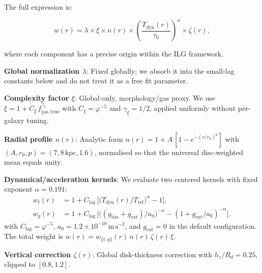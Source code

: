 \documentclass[12pt,a4paper]{article}
\begin{document}
The full expression is:

\begin{equation}
w(r) = \lambda \times \xi \times n(r) \times \left(\frac{T_\mathrm{dyn}(r)}{\tau_0}\right)^\alpha \times \zeta(r),
\end{equation}

where each component has a precise origin within the ILG framework.

\textbf{Global normalization $\lambda$}: Fixed globally; we absorb it into the small-lag constants below and do not treat it as a free fit parameter.

\textbf{Complexity factor $\xi$}: Global-only, morphology/gas proxy. We use $\xi = 1 + C_\xi\, f_\mathrm{gas,true}^{\gamma_\xi}$ with $C_\xi = \varphi^{-5}$ and $\gamma_\xi = 1/2$, applied uniformly without per-galaxy tuning.

\textbf{Radial profile $n(r)$}: Analytic form $n(r) = 1 + A\,[1 - e^{-(r/r_0)^p}]$ with $(A, r_0, p) = (7, 8\,\mathrm{kpc}, 1.6)$, normalised so that the universal disc-weighted mean equals unity.

\textbf{Dynamical/acceleration kernels}: We evaluate two centered kernels with fixed exponent $\alpha = 0.191$:
\begin{align}
w_t(r) &= 1 + C_\mathrm{lag}\,\Big[\big(T_\mathrm{dyn}(r)/T_\mathrm{ref}\big)^{\alpha} - 1\Big],\\
w_g(r) &= 1 + C_\mathrm{lag}\,\Big[\big((g_\mathrm{bar}+g_\mathrm{ext})/a_0\big)^{-\alpha} - (1+g_\mathrm{ext}/a_0)^{-\alpha}\Big],
\end{align}
with $C_\mathrm{lag} = \varphi^{-5}$, $a_0 = 1.2\times10^{-10}\,\mathrm{m\,s^{-2}}$, and $g_\mathrm{ext}=0$ in the default configuration. The total weight is $w(r) = w_{\{t,g\}}(r)\, n(r)\,\zeta(r)\,\xi$.

\textbf{Vertical correction $\zeta(r)$}: Global disk-thickness correction with $h_z/R_d = 0.25$, clipped to $[0.8, 1.2]$.
\end{document}
